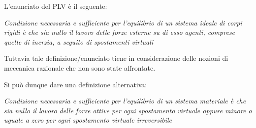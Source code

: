 	L'enunciato del PLV è il seguente:
	\begin{center}
		\emph{Condizione necessaria e sufficiente per l'equilibrio di un sistema ideale di corpi rigidi è che sia nullo il lavoro delle forze esterne su di esso agenti, comprese quelle di inerzia, a seguito di spostamenti virtuali}
	\end{center}
	
	Tuttavia tale definizione/enunciato tiene in considerazione delle nozioni di meccanica razionale che non sono state affrontate.
	
	Si può dunque dare una definizione alternativa:
	
	\begin{center}
	\emph{Condizione necessaria e sufficiente per l'equilibrio di un sistema materiale è che sia nullo il lavoro delle forze attive per ogni spostamento virtuale oppure minore o uguale a zero per ogni spostamento virtuale irreversibile}
	\end{center}
	
